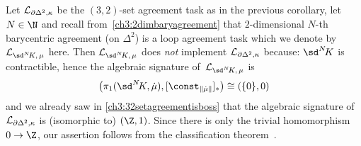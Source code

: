\begin{thCorollary}
    Let $\mathcal{L}_{\partial\Delta^2,\kappa}$ be the $(3,2)$-set agreement task as
    in the previous corollary, let $N\in\N$ and recall
    from~\cref{ch3:2dimbaryagreement} that $2$-dimensional $N$-th barycentric
    agreement (on $\Delta^2$) is a loop agreement task which we denote by
    $\Loop{\sdNK,\,\mu}$ here. Then $\Loop{\sdNK,\,\mu}$ does \emph{not}
    implement $\mathcal{L}_{\partial\Delta^2,\kappa}$ because: $\sdNK$ is
    contractible, hence the algebraic signature of~$\Loop{\sdNK,\,\mu}$ is
    \[ \bigl( \pi_1(\sdNK,\dot\mu), [\const_{\geom{\dot\mu}}]_\ast
        \bigr) \cong (\{0\}, 0)
    \]
    and we already saw in \cref{ch3:32setagreementisboss} that the algebraic
    signature of $\mathcal{L}_{\partial\Delta^2,\kappa}$ is (isomorphic to) $(\Z,1)$.
    Since there is only the trivial homomorphism $0\to\Z$, our assertion follows
    from the classification theorem~.
\end{thCorollary}
